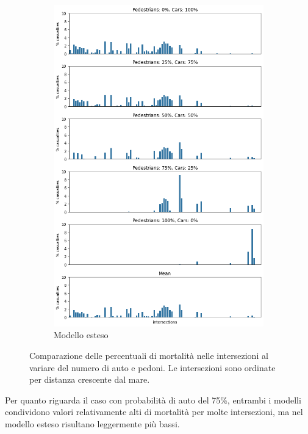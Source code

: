 \begin{figure}[ht]
\begin{subfigure}{0.475\textwidth}
        \includegraphics[width=\textwidth]{images/analisi/comparison-critical-ints-new.png}
        \caption{Modello esteso}
        \label{fig:new-ints-casualties}
    \end{subfigure}
    \caption{%
        Comparazione delle percentuali di mortalità nelle intersezioni al variare del numero di auto e pedoni.
        Le intersezioni sono ordinate per distanza crescente dal mare.
    }
    \label{fig:analisi-comparison-critical-ints1}
\end{figure}

Per quanto riguarda il caso con probabilità di auto del 75\%, entrambi i modelli condividono valori relativamente alti di mortalità per molte intersezioni,
ma nel modello esteso risultano leggermente più bassi.

